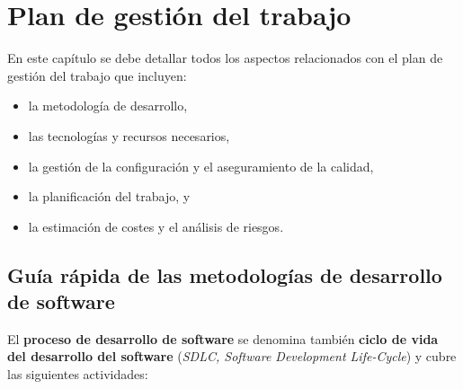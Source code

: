 \chapter{Plan de gestión del trabajo}\label{cap:Planificacion}
En este capítulo se debe detallar todos los aspectos relacionados con el plan de gestión del trabajo que incluyen: 
\begin{itemize}[noitemsep]
\item la metodología de desarrollo, 
\item las tecnologías y recursos necesarios, 
\item la gestión de la configuración y el aseguramiento de la calidad, 
\item la planificación del trabajo, y
\item la estimación de costes y el análisis de riesgos.
\end{itemize}




\section{Guía rápida de las metodologías de desarrollo de software}
El \textbf{proceso de desarrollo de software} se denomina también \textbf{ciclo de vida del desarrollo del software} (\emph{SDLC, Software Development Life-Cycle}) y cubre las siguientes actividades:

